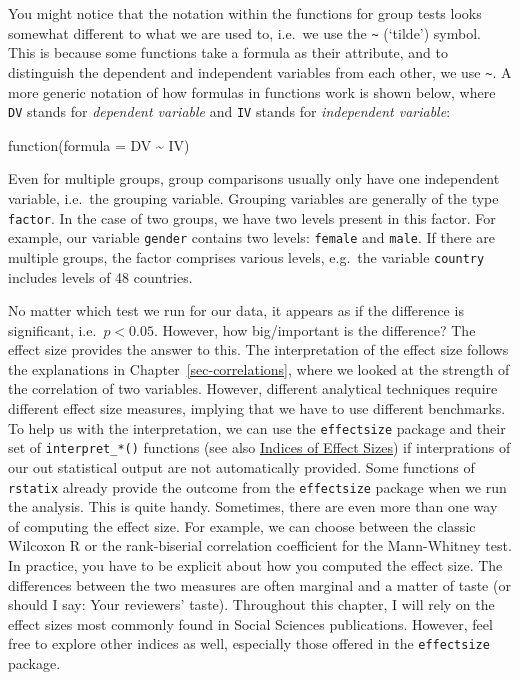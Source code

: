 \documentclass[
  letterpaper,
  DIV=11,
  numbers=noendperiod]{scrreprt}
\begin{document}
You might notice that the notation within the functions for group tests
looks somewhat different to what we are used to, i.e.~we use the
\texttt{\textasciitilde{}} (`tilde') symbol. This is because some
functions take a formula as their attribute, and to distinguish the
dependent and independent variables from each other, we use
\texttt{\textasciitilde{}}. A more generic notation of how formulas in
functions work is shown below, where \texttt{DV} stands for
\emph{dependent variable} and \texttt{IV} stands for \emph{independent
variable}:

\label{formulas-in-functions}
function(formula = DV \textasciitilde{} IV)

Even for multiple groups, group comparisons usually only have one
independent variable, i.e.~the grouping variable. Grouping variables are
generally of the type \texttt{factor}. In the case of two groups, we
have two levels present in this factor. For example, our variable
\texttt{gender} contains two levels: \texttt{female} and \texttt{male}.
If there are multiple groups, the factor comprises various levels,
e.g.~the variable \texttt{country} includes levels of 48 countries.

No matter which test we run for our data, it appears as if the
difference is significant, i.e.~\(p < 0.05\). However, how big/important
is the difference? The effect size provides the answer to this. The
interpretation of the effect size follows the explanations in
Chapter~\ref{sec-correlations}, where we looked at the strength of the
correlation of two variables. However, different analytical techniques
require different effect size measures, implying that we have to use
different benchmarks. To help us with the interpretation, we can use the
\texttt{effectsize} package and their set of \texttt{interpret\_*()}
functions (see also
\href{https://easystats.github.io/effectsize/articles/interpret.html}{Indices
of Effect Sizes}) if interprations of our out statistical output are not
automatically provided. Some functions of \texttt{rstatix} already
provide the outcome from the \texttt{effectsize} package when we run the
analysis. This is quite handy. Sometimes, there are even more than one
way of computing the effect size. For example, we can choose between the
classic Wilcoxon R or the rank-biserial correlation coefficient for the
Mann-Whitney test. In practice, you have to be explicit about how you
computed the effect size. The differences between the two measures are
often marginal and a matter of taste (or should I say: Your reviewers'
taste). Throughout this chapter, I will rely on the effect sizes most
commonly found in Social Sciences publications. However, feel free to
explore other indices as well, especially those offered in the
\texttt{effectsize} package.
\end{document}
